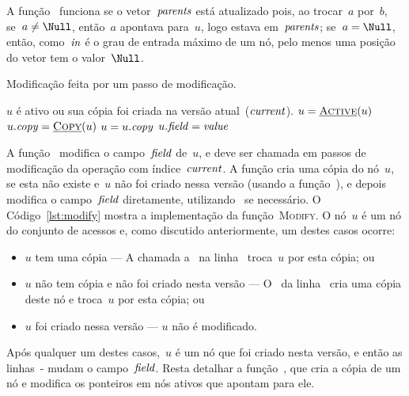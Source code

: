 \documentclass[../../main.tex]{subfiles}
\begin{document}
A função~ funciona se o vetor~$\mathit{parents}$ está atualizado pois, ao trocar~$a$ por~$b$, se~$a \neq \Null$, então~$a$ apontava para~$u$, logo estava em~$\mathit{parents}$; se~$a = \Null$, então, como~$\mathit{in}$ é o grau de entrada máximo de um nó, pelo menos uma posição do vetor tem o valor~$\Null$.

\begin{algorithm}
\caption{Modificação feita por um passo de modificação.} \label{lst:modify}
\begin{algorithmic}[1]

\Require $u$ é ativo ou sua cópia foi criada na versão atual~($\mathit{current}$).
	\State $u = \Call{\auxfunc{Active}}{u}$ \label{line:modify:active}
	 \label{line:modify:if2}
		\State $u.\cp = \Call{\auxfunc{Copy}}{u}$ \label{line:modify:copy}
		\State $u = u.\mathit{copy}$
	\EndIf
	 \label{line:modify:chngb}
		\State {}
	\Else
		\State $u.\mathit{field} = \mathit{value}$
		\EndIf \label{line:modify:chnge}
\EndFunction

\end{algorithmic}
\end{algorithm}

A função~ modifica o campo~$\mathit{field}$ de~$u$, e deve ser chamada em passos de modificação da operação com índice~$\mathit{current}$. A função cria uma cópia do nó~$u$, se esta não existe e~$u$ não foi criado nessa versão (usando a função~\textsc{}), e depois modifica o campo~$\mathit{field}$ diretamente, utilizando~\textsc{} se necessário.
O Código~\ref{lst:modify} mostra a implementação da função~\textsc{Modify}. O nó~$u$ é um nó do conjunto de acessos e, como discutido anteriormente, um destes casos ocorre:
\begin{itemize}
	\item $u$ tem uma cópia --- A chamada a~\textsc{} na linha~ troca~$u$ por esta cópia; ou
	\item $u$ não tem cópia e não foi criado nesta versão --- O~ da linha~ cria uma cópia deste nó e troca~$u$ por esta cópia; ou
	\item $u$ foi criado nessa versão --- $u$ não é modificado.
\end{itemize}

Após qualquer um destes casos,~$u$ é um nó que foi criado nesta versão, e então as linhas~- mudam o campo~$\mathit{field}$.
Resta detalhar a função~\textsc{}, que cria a cópia de um nó e modifica os ponteiros em nós ativos que apontam para ele.
\end{document}

